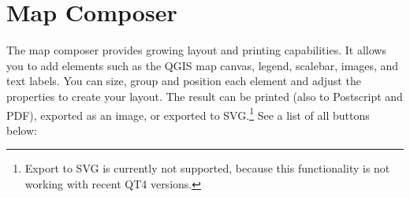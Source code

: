 
\section{Map Composer}\label{label_mapcomposer}

\updatedisclaimer

The map composer provides growing layout and printing
capabilities. It allows you to add elements such as the QGIS map canvas, 
legend, scalebar, images, and text labels. You can size, group 
and position each element and adjust the properties to create your layout. 
The result can be printed (also to Postscript and PDF), exported as an image, 
or exported to SVG.\footnote{Export to SVG is currently not supported, 
because this functionality is not working with recent QT4 versions.} See a
list of all buttons below:

